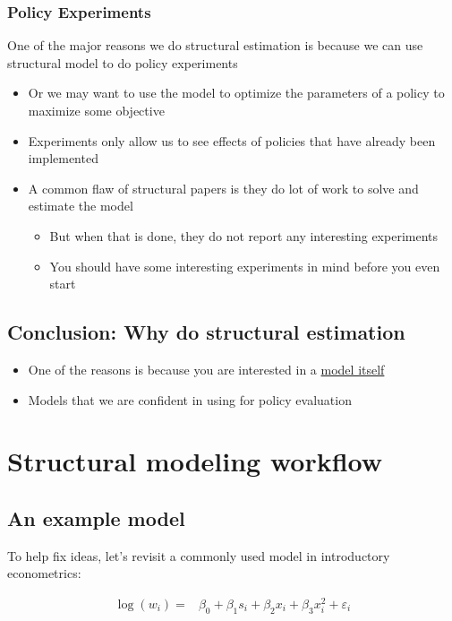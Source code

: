 \documentclass[11pt]{article}
\begin{document}
\subsubsection{Policy Experiments}
\label{sec:org08b15c2}

One of the major reasons we do structural estimation is because we can use structural model to do policy experiments
\begin{itemize}
\item Or we may want to use the model to optimize the parameters of a policy to maximize some objective
\item Experiments only allow us to see effects of policies that have already been implemented
\item A common flaw of structural papers is they do lot of work to solve and estimate the model
\begin{itemize}
\item But when that is done, they do not report any interesting experiments
\item You should have some interesting experiments in mind before you even start
\end{itemize}
\end{itemize}

\subsection{Conclusion: Why do structural estimation}
\label{sec:org2ce18c0}

\begin{itemize}
\item One of the reasons is because you are interested in a \uline{model itself}
\item Models that we are confident in using for policy evaluation
\end{itemize}

\section{Structural modeling workflow}
\label{sec:org3f8e21b}

\subsection{An example model}
\label{sec:org0c730b1}

To help fix ideas, let's revisit a commonly used model in introductory econometrics:


\begin{align}
\log(w_{i}) =& \beta_0 + \beta_1 s_{i} + \beta_2 x_{i} + \beta_3 x^2_{i} + \varepsilon_{i}
\label{eq:basicmincer}
\end{align}
\end{document}
